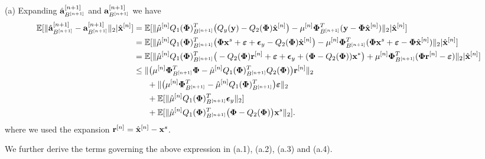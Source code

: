 \documentclass{article}
\begin{document}
{(a)} Expanding $\hat{{\bf a}}_{B^{[n+1]}}^{[n+1]}$ and ${{\bf a}}_{B^{[n+1]}}^{[n+1]}$ we have
\begin{equation}\label{quantization_error_terms}
    \begin{split}
      \mathbb{E}[  \|\hat{{\bf a}}_{B^{[n+1]}}^{[n+1]} - {{\bf a}}_{B^{[n+1]}}^{[n+1]} \|_2| \hat{{\bf x}}^{[n]}] &= \mathbb{E}[\|\hat{\mu}^{[n]}Q_1({\bf {\bf \Phi}})_{B^{[n+1]}}^T\big(Q_y({\bf y})-Q_2({\bf {\bf \Phi}})\hat{{\bf x}}^{[n]}\big) - {\mu}^{[n]}{\bf {\bf \Phi}}_{B^{[n+1]}}^T({\bf y}-{\bf {\bf \Phi}}\hat{{\bf x}}^{[n]}) \|_2| \hat{{\bf x}}^{[n]}]\\
        &=\mathbb{E}[\|\hat{\mu}^{[n]}Q_1({\bf {\bf \Phi}})_{B^{[n+1]}}^T\big({\bf {\bf \Phi}} {\bf x}^s +\boldsymbol{\varepsilon}+\boldsymbol{\epsilon}_y-Q_2({\bf {\bf \Phi}})\hat{{\bf x}}^{[n]}\big) - {\mu}^{[n]}{\bf {\bf \Phi}}_{B^{[n+1]}}^T({\bf {\bf \Phi}}{\bf x}^s +\boldsymbol{\varepsilon}-{\bf {\bf \Phi}}\hat{{\bf x}}^{[n]}) \|_2| \hat{{\bf x}}^{[n]}]\\
        &=\mathbb{E}[\|\hat{\mu}^{[n]}Q_1({\bf {\bf \Phi}})_{B^{[n+1]}}^T\big(-Q_2({\bf {\bf \Phi}}) {\bf r}^{[n]} +\boldsymbol{\varepsilon}+\boldsymbol{\epsilon}_y+({\bf {\bf \Phi}}-Q_2({\bf {\bf \Phi}})){\bf x}^{*}\big)+{\mu}^{[n]}{\bf {\bf \Phi}}_{B^{[n+1]}}^T({\bf {\bf \Phi}}{\bf r}^{[n]} -\boldsymbol{\varepsilon}) \|_2| \hat{{\bf x}}^{[n]}]\\
        &\leq \|\big(\mu^{[n]}{\bf {\bf \Phi}}_{B^{[n+1]}}^T{\bf {\bf \Phi}} - \hat{\mu}^{[n]}Q_1({\bf {\bf \Phi}})_{B^{[n+1]}}^T Q_2({\bf {\bf \Phi}})\big) {\bf r}^{[n]} \|_2\\
        &\ \ \ \ \  +\|\big(\mu^{[n]}{\bf {\bf \Phi}}_{B^{[n+1]}}^T - \hat{\mu}^{[n]}Q_1({\bf {\bf \Phi}})_{B^{[n+1]}}^T \big)\boldsymbol{\varepsilon} \|_2\\
     &\ \ \ \  \  +\mathbb{E}[\|\hat{\mu}^{[n]}Q_1({\bf {\bf \Phi}})_{B^{[n+1]}}^T\boldsymbol{\epsilon}_y \|_2]\\
     &\ \ \ \  \  +\mathbb{E}[\| \hat{\mu}^{[n]}Q_1({\bf \Phi})_{B^{[n+1]}}^T\big({\bf {\bf \Phi}}-Q_2({\bf {\bf \Phi}})\big){\bf x}^s \|_2].
    \end{split}
\end{equation}
where we used the expansion ${{\bf r}}^{[n]} = \hat{{\bf x}}^{[n]}-{\bf x}^s$.

We further derive the terms governing the above expression in (a.1), (a.2), (a.3) and (a.4). 
\end{document}
